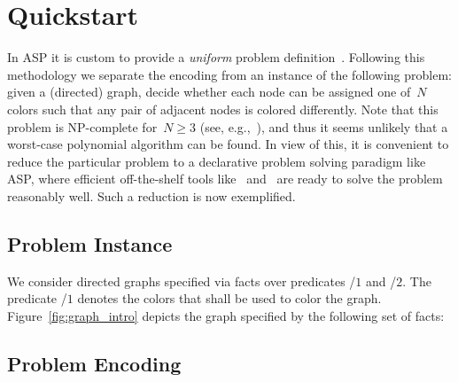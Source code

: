 \section{Quickstart}

In ASP it is custom to provide a \emph{uniform}
problem definition~\cite{martru99a,niemela99a,schlipf95a}.
Following this methodology we separate the encoding
from an instance of the following problem:
given a (directed) graph, decide whether each node can be assigned
one of~$N$ colors such that any pair of adjacent nodes is colored differently.
Note that this problem is NP-complete for~$N\geq 3$
(see, e.g.,~\cite{papadimitriou94a}),
and thus it seems unlikely that a worst-case polynomial algorithm
can be found.
In view of this,
it is convenient to reduce the particular problem to
a declarative problem solving paradigm like ASP,
where efficient off-the-shelf tools like \gringo\ and \clasp\
are ready to solve the problem reasonably well.
Such a reduction is now exemplified.

\subsection{Problem Instance}\label{subsec:color:instance}


We consider directed graphs specified via facts over predicates
/$1$ and /$2$.%
The predicate /$1$ denotes the colors that shall be used to color the graph.
Figure~\ref{fig:graph_intro} depicts the graph specified by the following set of facts:
%


\subsection{Problem Encoding}\label{subsec:color:encoding}

